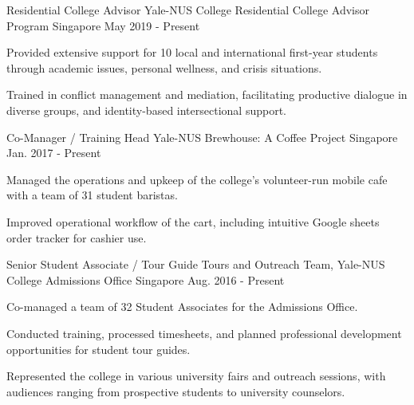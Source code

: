 

\begin{cventries}

  \cventry
  {Residential College Advisor} %
  {Yale-NUS College Residential College Advisor Program} %
  {Singapore} %
  {May 2019 - Present} %
  {
    \begin{cvitems} %
    \item {Provided extensive support for 10 local and international
        first-year students through academic issues, personal wellness, and
        crisis situations.}
    \item {Trained in conflict management and mediation, facilitating productive
      dialogue in diverse groups, and identity-based intersectional support.}
    \end{cvitems}
  }

  \cventry
  {Co-Manager / Training Head} %
  {Yale-NUS Brewhouse: A Coffee Project} %
  {Singapore} %
  {Jan. 2017 - Present} %
  {
    \begin{cvitems} %
    \item {Managed the operations and upkeep of the college's volunteer-run
        mobile cafe with a team of 31 student baristas.}
    \item {Improved operational workflow of the cart, including intuitive Google
      sheets order tracker for cashier use.}
    \end{cvitems}
  }

  \cventry
  {Senior Student Associate / Tour Guide}
  {Tours and Outreach Team, Yale-NUS College Admissions Office}
  {Singapore}
  {Aug. 2016 - Present}
  {
    \begin{cvitems}
    \item {Co-managed a team of 32 Student Associates for the Admissions
        Office.}
    \item {Conducted training, processed timesheets, and planned professional
        development opportunities for student tour guides.}
    \item{Represented the college in various university fairs and outreach
        sessions, with audiences ranging from prospective students to university
        counselors.}
    \end{cvitems}
  }


\end{cventries}
